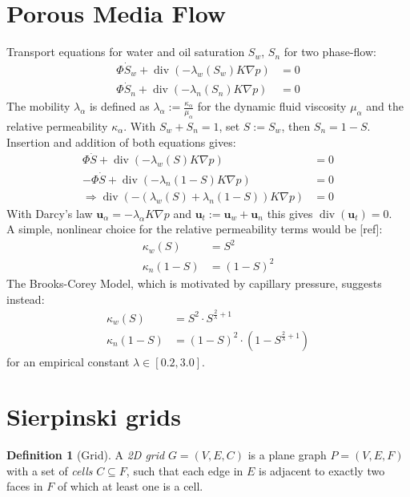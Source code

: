 \documentclass{IOS-Book-Article}
\theoremstyle{plain}
\theoremstyle{definition}
\newtheorem{definition}{Definition}[section]
\DeclareMathOperator{\diverg}{div}
\begin{document}
\newpage
\section{Porous Media Flow}

Transport equations for water and oil saturation $S_w$, $S_n$ for two phase-flow:
\begin{align}
	\Phi \dot S_w + \diverg (- \lambda_w (S_w) K \nabla p) &= 0 \\
	\Phi \dot S_n + \diverg (- \lambda_n (S_n) K \nabla p) &= 0
\end{align}
The mobility $\lambda_\alpha$ is defined as $\lambda_\alpha := \frac{\kappa_\alpha}{\mu_\alpha}$ for the dynamic fluid viscosity $\mu_\alpha$ and the relative permeability $\kappa_\alpha$.
With $S_w + S_n = 1$, set $S := S_w$, then $S_n = 1 - S$.
Insertion and addition of both equations gives:
\begin{align}
	\Phi \dot S + \diverg (- \lambda_w (S) K \nabla p) &= 0 \\
	- \Phi \dot{S} + \diverg (- \lambda_n (1 - S) K \nabla p) &= 0 \\
	\Rightarrow \diverg (- (\lambda_w (S) + \lambda_n (1 - S)) K \nabla p) &= 0
\end{align}
With Darcy's law $\mathbf u_\alpha = - \lambda_\alpha K \nabla p$ and $\mathbf u_t := \mathbf u_w + \mathbf u_n$ this gives $\diverg (\mathbf u_t) = 0$.\\
A simple, nonlinear choice for the relative permeability terms would be [ref]:
\begin{align}
	\kappa_w(S) &= S^2 \\
	\kappa_n(1 - S) &= (1 - S)^2
\end{align}
The Brooks-Corey Model, which is motivated by capillary pressure, suggests instead:
\begin{align}
	\kappa_w(S) &= S^2 \cdot S^{\frac{2}{\lambda} + 1} \\
	\kappa_n(1 - S) &= (1 - S)^2 \cdot (1 - S^{\frac{2}{\lambda} + 1}) 
\end{align}
for an empirical constant $\lambda \in [ 0.2, 3.0 ]$.


\newpage
\section{Sierpinski grids}

\begin{definition} [Grid]
	A \emph{2D grid} $G = (V, E, C)$ is a plane graph $P = (V, E, F)$ with a set of \emph{cells} $C \subseteq F$, such that each edge in $E$ is adjacent to exactly two faces in $F$ of which at least one is a cell.
\end{definition}
\end{document}
